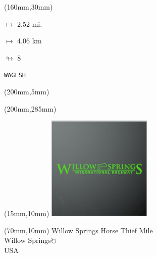 \begin{textblock*}{40mm}(160mm,30mm)%
\Large
\par$\mapsto$ 2.52 mi.
\par$\mapsto$ 4.06 km
\par$\looparrowright$ 8
\par\hfill\tiny\tt WAGLSH\\
\end{textblock*}
\begin{textblock*}{20mm}(200mm,5mm)%
\fbox{\thepage}
\label{WAGLSH}
\end{textblock*}
\begin{textblock*}{20mm}(200mm,285mm)%
\fbox{\thepage}
\end{textblock*}

\null\newpage
\begin{textblock*}{50mm}(15mm,10mm)%
\includegraphics[width=50mm]{LG/2015-05-20_00098.png}
\end{textblock*}
\begin{textblock*}{130mm}(70mm,10mm)%
{\fontsize{20}{20}\selectfont Willow Springs Horse Thief Mile\\}
{\fontsize{16}{16}\selectfont Willow Springs\hfill \Large$\circlearrowright$\\}
{\fontsize{12}{12}\selectfont USA\\}
\end{textblock*}
